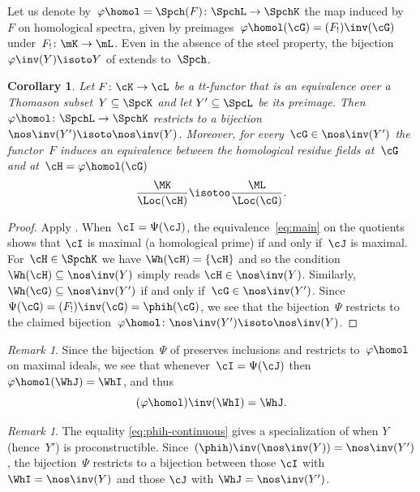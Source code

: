 \documentclass[11pt]{amsart}
\numberwithin{equation}{section} %
\theoremstyle{plain}
\newtheorem{cor}[equation]{Corollary}
\theoremstyle{definition}
\theoremstyle{remark}
\newtheorem{rem}[equation]{Remark}
\begin{document}
Let us denote by~$\varphi\homol=\Spch(F)\colon \SpchL\to \SpchK$ the map induced by~$F$ on homological spectra, given by preimages~$\varphi\homol(\cG)=(F_!)\inv(\cG)$ under~$F_!\colon \mK\to \mL$. Even in the absence of the steel property, the bijection $\varphi\inv(Y)\isoto Y$ of  extends to~$\Spch$.
%
\begin{cor}
\label{cor:Y-equiv-Spch}%
Let $F\colon \cK\to \cL$ be a tt-functor that is an equivalence over a Thomason subset~$Y\subseteq\SpcK$ and let $Y'\subseteq\SpcL$ be its preimage. Then $\varphi\homol\colon \SpchL\to \SpchK$ restricts to a bijection $\nos\inv(Y')\isoto \nos\inv(Y)$. Moreover, for every~$\cG\in\nos\inv(Y')$ the functor~$F$ induces an equivalence between the homological residue fields at~$\cG$ and at~$\cH=\varphi\homol(\cG)$
%
\[
\frac{\MK}{\Loc(\cH)}\isotoo \frac{\ML}{\Loc(\cG)}.
\]
%
\end{cor}
%
\begin{proof}
Apply . When~$\cI=\Psi(\cJ)$, the equivalence~\eqref{eq:main} on the  quotients shows that $\cI$ is maximal (a homological prime) if and only if~$\cJ$ is maximal. 
For~$\cH\in\SpchK$ we have $\Wh(\cH)=\{\cH\}$ and so the condition~$\Wh(\cH)\subseteq \nos\inv(Y)$ simply reads $\cH\in\nos\inv(Y)$. Similarly, $\Wh(\cG)\subseteq \nos\inv(Y')$ if and only if~$\cG\in\nos\inv(Y')$. 
Since $\Psi(\cG)=(F_!)\inv(\cG) = \phih(\cG)$, we see that the bijection~$\Psi$ restricts to the claimed bijection~$\varphi\homol\colon\nos\inv(Y')\isoto \nos\inv(Y)$.
\end{proof}

%
\begin{rem}
Since the bijection~$\Psi$ of  preserves inclusions and restricts to~$\varphi\homol$ on maximal ideals, we see that whenever~$\cI=\Psi(\cJ)$ then~$\varphi\homol(\WhJ)=\WhI$, and thus
%
\begin{equation}
\label{eq:phih-continuous}
(\varphi\homol)\inv(\WhI)=\WhJ.    
\end{equation}
%
\end{rem}
\begin{rem}
\label{rem:main-with-equality}%
The equality \eqref{eq:phih-continuous} gives a specialization of  when $Y$ (hence~$Y'$) is proconstructible.
Since~$(\phih)\inv(\nos\inv(Y)) = \nos\inv(Y')$, the bijection~$\Psi$ restricts to a bijection between those $\cI$ with $\WhI = \nos\inv(Y)$ and those $\cJ$ with $\WhJ = \nos\inv(Y')$.
\end{rem}
\end{document}
